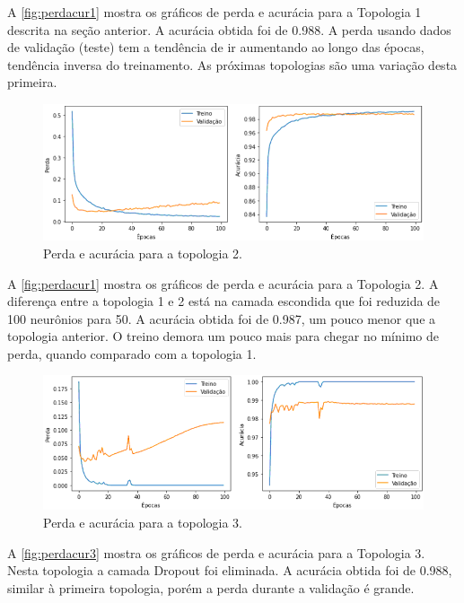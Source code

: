 \documentclass[sigconf, nonacm, screen]{acmart}
\begin{document}
A \autoref{fig:perdacur1} mostra os gráficos de perda e acurácia para a Topologia 1 descrita na seção anterior. A acurácia obtida foi de 0.988. A perda usando dados de validação (teste) tem a tendência de ir aumentando ao longo das épocas, tendência inversa do treinamento. As próximas topologias são uma variação desta primeira.

\begin{figure}[ht]
	\centering
	\includegraphics[width=\linewidth]{img/perd_acur_2}
	\caption{Perda e acurácia para a topologia 2.}
	\label{fig:perdacur2}
\end{figure}

A \autoref{fig:perdacur1} mostra os gráficos de perda e acurácia para a Topologia 2. A diferença entre a topologia 1 e 2 está na camada escondida que foi reduzida de 100 neurônios para 50. A acurácia obtida foi de 0.987, um pouco menor que a topologia anterior. O treino demora um pouco mais para chegar no mínimo de perda, quando comparado com a topologia 1.

\begin{figure}[ht]
	\centering
	\includegraphics[width=\linewidth]{img/perd_acur_3}
	\caption{Perda e acurácia para a topologia 3.}
	\label{fig:perdacur3}
\end{figure}

A \autoref{fig:perdacur3} mostra os gráficos de perda e acurácia para a Topologia 3. Nesta topologia a camada Dropout foi eliminada. A acurácia obtida foi de 0.988, similar à primeira topologia, porém a perda durante a validação é grande.
\end{document}
